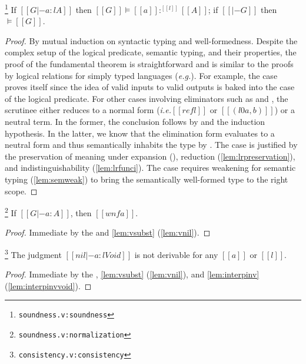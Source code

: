 \documentclass[acmsmall, screen=true, nonacm=true,
  review=\ifpublic false\else true\fi,
  anonymous=\ifanonymous true\else false\fi
]{acmart}
\makeatletter
\newcommand{\ie}{\textit{i.e.}\@\xspace}
\newcommand{\eg}{\textit{e.g.}\@\xspace}
\newcommand{\suppl}[3]{{\scriptsize\texttt{#2:#3}}}
\newcommand{\swt}[4]{#1 \vDash #2 :^{#3} #4}
\newcommand{\swf}[1]{\vDash #1}
\newlength{\punctwidth}
\newcommand{\stack}[1]{%
  \settowidth{\punctwidth}{#1}%
  \hspace*{-\the\punctwidth}%
}
\makeatother
\begin{document}
\begin{theorem}
  \stack{.~}\footnote{\suppl{theories}{soundness.v}{soundness}}
  \label{thm:fundamental}
  If $[[G |- a : l A]]$ then $\swt{[[G]]}{[[a]]}{[[l]]}{[[A]]}$;
  if $[[|- G]]$ then $\swf{[[G]]}$.
\end{theorem}
\begin{proof}
By mutual induction on syntactic typing and
well-formedness. Despite the complex setup of the logical predicate,
semantic typing, and their properties, the proof of the fundamental
theorem is straightforward and is similar to the proofs by logical
relations for simply typed languages (\eg \citet{abel:poplmark}).
For example, the  case proves itself since
the idea of valid inputs to valid outputs is baked into the
 case of the logical predicate.
For other cases involving eliminators such as  and , the
scrutinee either reduces to a normal form (\ie $[[refl]]$ or $[[(l0 a, b)]]$) or a neutral
term. In the former, the conclusion follows by
 and the induction
hypothesis. In the latter, we know that the elimination form
evaluates to a neutral form and thus semantically inhabits the type by
.
The  case is justified by
the preservation of meaning under expansion (),
reduction (\cref{lem:lrpreservation}), and indistinguishability
(\cref{lem:lrfunci}).
The  case requires weakening for semantic typing
(\cref{lem:semweak}) to bring the semantically well-formed type to the
right scope.
\end{proof}

\begin{corollary}
  \stack{.~}\footnote{\suppl{theories}{soundness.v}{normalization}}
  \label{cor:wtwn}
  If $[[G |- a : A]]$, then $[[wnf a]]$.
\end{corollary}
\begin{proof}
  Immediate by the  and \cref{lem:vsubst} (\ref{lem:vnil}).
\end{proof}

\begin{corollary}
  \stack{.~}\footnote{\suppl{theories}{consistency.v}{consistency}}
  The judgment $[[nil |- a : l Void]]$ is not derivable for any
  $[[a]]$ or $[[l]]$.
\end{corollary}
\begin{proof}
  Immediate by the , \cref{lem:vsubst}
  (\ref{lem:vnil}), and \cref{lem:interpinv} (\ref{lem:interpinvvoid}).
\end{proof}
\end{document}
